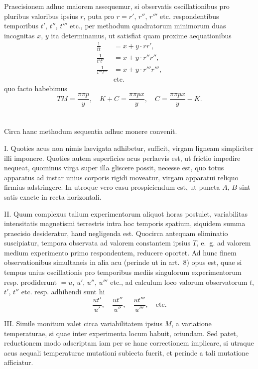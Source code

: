 \documentclass[fontsize=11pt,paper=a4,twoside,openany]{scrbook}
\begin{document}
Praecisionem adhuc maiorem assequemur, si observatis oscillationibus pro pluribus valoribus ipsius $r$, puta pro $r=r'$, $r''$, $r'''$ etc. respondentibus temporibus $t'$, $t''$, $t'''$ etc., per methodum quadratorum minimorum duas incognitas $x$, $y$ ita determinamus, ut satisfiat quam proxime aequationibus
\begin{align*}
\frac{1}{tt} &= x + y \cdot rr',\\
\frac{1}{t't'} &= x + y \cdot r''r'',\\
\frac{1}{t'''t'''} &= x + y \cdot r'''r''',\\
&\text{etc.}
\end{align*}
quo facto habebimus
\[
TM = \frac{\pi\pi p}{y},\quad K+C = \frac{\pi\pi p x}{y},\quad C = \frac{\pi\pi p x}{y} - K.
\]

\section{}

Circa hanc methodum sequentia adhuc monere convenit.

I. Quoties acus non nimis laevigata adhibetur, sufficit, virgam ligneam simpliciter illi imponere. Quoties autem superficies acus perlaevis est, ut frictio impedire nequeat, quominus virga super illa gliscere possit, necesse est, quo totus apparatus ad instar unius corporis rigidi moveatur, virgam apparatui reliquo firmius adstringere. In utroque vero casu prospiciendum est, ut puncta $A$, $B$ sint satis exacte in recta horizontali.

II. Quum complexus talium experimentorum aliquot horas postulet, variabilitas intensitatis magnetismi terrestris intra hoc temporis spatium, siquidem summa praecisio desideratur, haud negligenda est. Quocirca antequam eliminatio suscipiatur, tempora observata ad valorem constantem ipsius $T$, e.~g. ad valorem medium experimento primo respondentem, reducere oportet. Ad hunc finem observationibus simultaneis in alia acu (perinde ut in art.~8) opus est, quae si tempus unius oscillationis pro temporibus mediis singulorum experimentorum resp. prodiderunt $=u$, $u'$, $u''$, $u'''$ etc., ad calculum loco valorum observatorum $t$, $t'$, $t''$ etc. resp. adhibendi sunt hi
\[
\frac{ut'}{u'},\quad \frac{ut''}{u''},\quad \frac{ut'''}{u'''},\quad \text{etc.}
\]

III. Simile monitum valet circa variabilitatem ipsius $M$, a variatione temperaturae, si quae inter experimenta locum habuit, oriundam. Sed patet, reductionem modo adscriptam iam per se hanc correctionem implicare, si utraque acus aequali temperaturae mutationi subiecta fuerit, et perinde a tali mutatione afficiatur.
\end{document}
